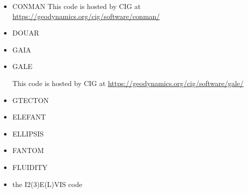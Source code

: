 \begin{itemize}


\item CONMAN
This code is hosted by CIG at \url{https://geodynamics.org/cig/software/conman/}

\cite{kirh90}
\cite{itki94}
\cite{kian95}
\cite{kian98}
\cite{itki98}
\cite{befo99}
\cite{kifr15}


\item DOUAR

\cite{brtf08}
\cite{thfb08}
\cite{yahb09}
\cite{brya09}
\cite{lobh10}
\cite{mutg13}
\cite{whbb14}
\cite{neew18}


\item GAIA

\item GALE

This code is hosted by CIG at \url{https://geodynamics.org/cig/software/gale/}

\cite{cmwt10}
\cite{lehm12}
\cite{arbi13}

\item GTECTON
\cite{gowo95}
\cite{gowo99}
\cite{bugw01}
\cite{bugw02}
\cite{gowo05}
\cite{degw06}
\cite{libi06}
\cite{bagw11}
\cite{bagw11b}
\cite{mags15}




\item ELEFANT

\cite{tosn15}
\cite{matv15}
\cite{busa16}
\cite{latb17}
\cite{thie17}
\cite{pltv18}

\item ELLIPSIS

\cite{modm03}
\cite{omma06} 
\cite{moql07}
\cite{dyrm07}
\cite{onlg08}
\cite{pyeg10}
\cite{legu11}
\cite{lega12}


\item FANTOM

\cite{thie11}
\cite{alht11}
\cite{alht12}
\cite{alhf13}
\cite{erhv14}
\cite{thsh14}
\cite{erhv15}
\cite{erhv19}



\item FLUIDITY
\cite{dawk11}
\cite{gagd14}

\item the I2(3)E(L)VIS code

\cite{geyu03}\cite{geyu03b}\cite{geur03}
\cite{geym04}\cite{geys04}\cite{gepm04}
\cite{buge05}
\cite{bbeg06}\cite{gest06}\cite{gogc06}\cite{gecy06}
\cite{geyu07}\cite{gogc07}
\cite{scbe08}\cite{gecy08}\cite{uegs08}\cite{fagc08}\cite{zgyh09}
\cite{gefc09}
\cite{gerya2010}\cite{nigm10}
\cite{dugm11}\cite{dumg11}\cite{lixg11}\cite{gery11}\cite{geme11}
\cite{crsg12}\cite{dugk12}\cite{lixg12}
\cite{lixg13}\cite{nabg13}\cite{magc13}\cite{digd13a}\cite{digd13b}\cite{zhgt13}\cite{dyge13}\cite{gemd13}\cite{mana13}
\cite{dugs14}\cite{puge14}\cite{rugb14}\cite{voge14b}\cite{bagb14}\cite{lige14}\cite{stjm14}\cite{malg14}
\cite{buge14}\cite{gosk14}\cite{bagb14}\cite{vamd14}
\cite{duay15}\cite{uewg15}\cite{rula15}\cite{gesb15}\cite{rula15}
\cite{kobc16}\cite{magc16}\cite{fige16}


\end{itemize}
